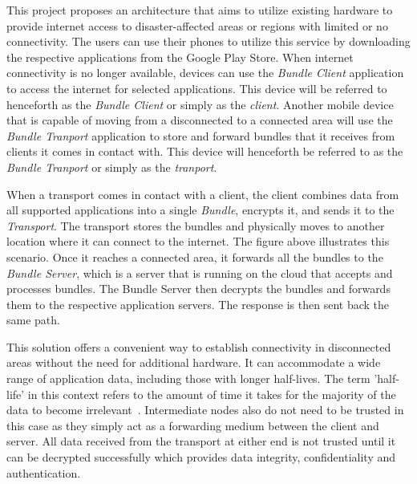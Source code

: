 This project proposes an architecture that aims to utilize existing hardware to provide internet access to disaster-affected areas or regions with limited or no connectivity. The users can use their phones to utilize this service by downloading the respective applications from the Google Play Store. When internet connectivity is no longer available, devices can use the \textit{Bundle Client} application to access the internet for selected applications. This device will be referred to henceforth as the \textit{Bundle Client} or simply as the \textit{client}. Another mobile device that is capable of moving from a disconnected to a connected area will use the \textit{Bundle Tranport} application to store and forward bundles that it receives from clients it comes in contact with. This device will henceforth be referred to as the \textit{Bundle Tranport} or simply as the \textit{tranport}.

When a transport comes in contact with a client, the client combines data from all supported applications into a single \textit{Bundle}, encrypts it, and sends it to the \textit{Transport}. The transport stores the bundles and physically moves to another location where it can connect to the internet. The figure above illustrates this scenario. Once it reaches a connected area, it forwards all the bundles to the \textit{Bundle Server}, which is a server that is running on the cloud that accepts and processes bundles. The Bundle Server then decrypts the bundles and forwards them to the respective application servers. The response is then sent back the same path.

This solution offers a convenient way to establish connectivity in disconnected areas without the need for additional hardware. It can accommodate a wide range of application data, including those with longer half-lives. The term 'half-life' in this context refers to the amount of time it takes for the majority of the data to become irrelevant~\cite{data_halflife}. Intermediate nodes also do not need to be trusted in this case as they simply act as a forwarding medium between the client and server. All data received from the transport at either end is not trusted until it can be decrypted successfully which provides data integrity, confidentiality and authentication.